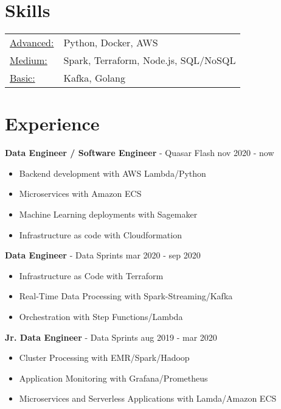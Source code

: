 \documentclass[margin]{res}
\begin{document}
 
\address{{\bf Contact Information } 
        \\  São Paulo, Brazil
        \\  anntonio@protonmail.ch
        }
\address{{\bf Additional Information} 
        \\ github.com/tonio-m
        \\ linkedin.com/in/vieira-marco
}

 
\begin{resume} 

\section{Skills}
   \begin{tabular}{l p{3in}}
      \underline{Advanced:} & Python, Docker, AWS \\
      \underline{Medium:} &   Spark, Terraform, Node.js, SQL/NoSQL \\
      \underline{Basic:} &  Kafka, Golang
 \end{tabular}

 
\section{Experience}
    {\bf Data Engineer / Software Engineer} - Quasar Flash \hfill nov 2020 - now
    \begin{itemize} \itemsep -2pt  
    \item Backend development with AWS Lambda/Python
    \item Microservices with Amazon ECS
    \item Machine Learning deployments with Sagemaker
    \item Infrastructure as code with Cloudformation
    \end{itemize}

    {\bf Data Engineer} - Data Sprints \hfill mar 2020 - sep 2020
    \begin{itemize} \itemsep -2pt  
    \item Infrastructure as Code with Terraform
    \item Real-Time Data Processing with Spark-Streaming/Kafka
    \item Orchestration with Step Functions/Lambda 
    \end{itemize}
 
    {\bf Jr. Data Engineer} - Data Sprints \hfill aug 2019 - mar 2020
    \begin{itemize} \itemsep -2pt 
    \item Cluster Processing with EMR/Spark/Hadoop 
    \item Application Monitoring with Grafana/Prometheus 
    \item Microservices and Serverless Applications with Lamda/Amazon ECS 
    \end{itemize}


\end{resume}
\end{document}
